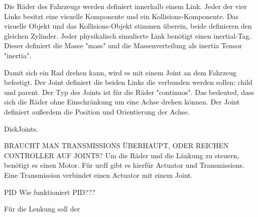 Die Räder des Fahrzeugs werden definiert innerhalb einem Link.
Jeder der vier Links besitzt eine visuelle Komponente und ein Kollisions-Komponente.
Das visuelle Objekt und das Kollisions-Objekt stimmen überein, beide definieren den gleichen Zylinder.
Jeder physikalisch simulierte Link benötigt einen inertial-Tag.
Dieser definiert die Masse "mass" und die Massenverteilung als inertia Tensor "inertia".

Damit sich ein Rad drehen kann, wird es mit einem Joint an dem Fahrzeug befestigt.
Der Joint definiert die beiden Links die verbunden werden sollen: child und parent.
Der Typ des Joints ist für die Räder "continuos". Das bedeuted, dass sich die Räder ohne Einschränkung um eine Achse drehen können.
Der Joint definiert außerdem die Position und Orientierung der Achse.

DiskJoints.

BRAUCHT MAN TRANSMISSIONS ÜBERHAUPT, ODER REICHEN CONTROLLER AUF JOINTS?
Um die Räder und die Länkung zu steuern, benötigt es einen Motor. 
Für urdf gibt es hierfür Actuator und Transmissions.
Eine Transmission verbindet einen Actuator mit einem Joint. 

PID 
Wie funktioniert PID???

Für die Lenkung soll der 